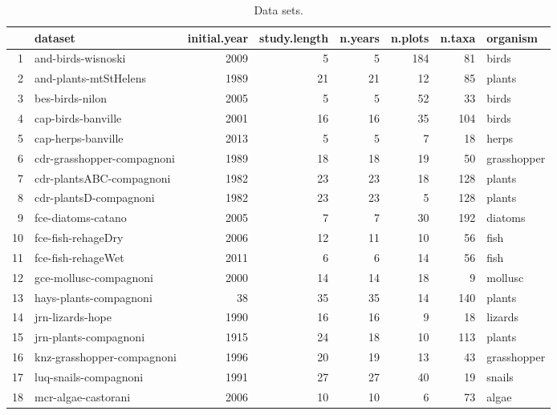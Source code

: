 \documentclass[11pt, oneside]{article}
\begin{document}

\begin{table}[ht]
\centering
\caption{Data sets.} 
\begin{tabular}{rlrrrrrl}
  \hline
 & dataset & initial.year & study.length & n.years & n.plots & n.taxa & organism \\ 
  \hline
1 & and-birds-wisnoski & 2009 &   5 &   5 & 184 &  81 & birds \\ 
  2 & and-plants-mtStHelens & 1989 &  21 &  21 &  12 &  85 & plants \\ 
  3 & bes-birds-nilon & 2005 &   5 &   5 &  52 &  33 & birds \\ 
  4 & cap-birds-banville & 2001 &  16 &  16 &  35 & 104 & birds \\ 
  5 & cap-herps-banville & 2013 &   5 &   5 &   7 &  18 & herps \\ 
  6 & cdr-grasshopper-compagnoni & 1989 &  18 &  18 &  19 &  50 & grasshopper \\ 
  7 & cdr-plantsABC-compagnoni & 1982 &  23 &  23 &  18 & 128 & plants \\ 
  8 & cdr-plantsD-compagnoni & 1982 &  23 &  23 &   5 & 128 & plants \\ 
  9 & fce-diatoms-catano & 2005 &   7 &   7 &  30 & 192 & diatoms \\ 
  10 & fce-fish-rehageDry & 2006 &  12 &  11 &  10 &  56 & fish \\ 
  11 & fce-fish-rehageWet & 2011 &   6 &   6 &  14 &  56 & fish \\ 
  12 & gce-mollusc-compagnoni & 2000 &  14 &  14 &  18 &   9 & mollusc \\ 
  13 & hays-plants-compagnoni &  38 &  35 &  35 &  14 & 140 & plants \\ 
  14 & jrn-lizards-hope & 1990 &  16 &  16 &   9 &  18 & lizards \\ 
  15 & jrn-plants-compagnoni & 1915 &  24 &  18 &  10 & 113 & plants \\ 
  16 & knz-grasshopper-compagnoni & 1996 &  20 &  19 &  13 &  43 & grasshopper \\ 
  17 & luq-snails-compagnoni & 1991 &  27 &  27 &  40 &  19 & snails \\ 
  18 & mcr-algae-castorani & 2006 &  10 &  10 &   6 &  73 & algae \\ 

\end{tabular}
\end{table}
\end{document}
